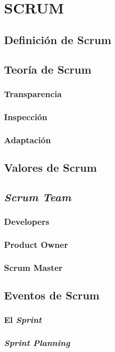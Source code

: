 \section{SCRUM}
	\subsection{Definici\'{o}n de Scrum}
	\subsection{Teor\'{i}a de Scrum}
		\subsubsection{Transparencia}
		\subsubsection{Inspecci\'{o}n}
		\subsubsection{Adaptaci\'{o}n}
	\subsection{Valores de Scrum}
	\subsection{\textit{Scrum Team}}
		\subsubsection{Developers}
		\subsubsection{Product Owner}
		\subsubsection{Scrum Master}
	\subsection{Eventos de Scrum}
		\subsubsection{El \textit{Sprint}}
		\subsubsection{\textit{Sprint Planning}}
